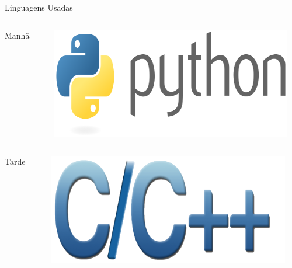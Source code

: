 \documentclass[10pt]{beamer}
\begin{document}
\begin{frame}{Linguagens Usadas}
	\begin{columns}
		\begin{column}{7cm}
			\begin{center}
				\vskip 0.5cm
				\Huge Manh\~a
			\end{center}
		\end{column}
		\begin{column}{7cm}
			\begin{minipage}[b]{0.4\textwidth}
				\vskip 0.5cm
				\includegraphics[width=\textwidth]{figuras/python.png}
			\end{minipage}
		\end{column}
	\end{columns}
	\hfill
	\begin{columns}
		\begin{column}{7cm}
			\begin{center}
				\vskip 0.5cm
				\Huge Tarde
			\end{center}
		\end{column}
		\begin{column}{7cm}
			\begin{minipage}[b]{0.4\textwidth}
				\vskip 0.5cm
				\includegraphics[width=\textwidth]{figuras/cplusplus.png}
			\end{minipage}
		\end{column}
	\end{columns}
	
\end{frame}
\end{document}
